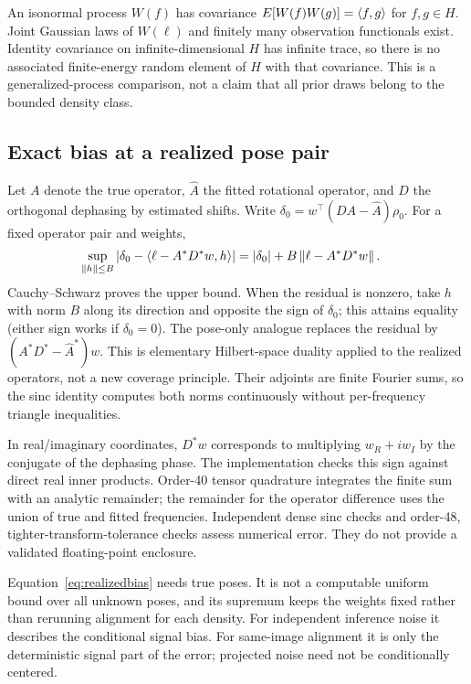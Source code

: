 An isonormal process $W(f)$ has covariance $E[W(f)W(g)]=\langle f,g\rangle$ for
$f,g\in H$. Joint Gaussian laws of $W(\ell)$ and finitely many observation
functionals exist. Identity covariance on infinite-dimensional $H$ has
infinite trace, so there is no associated finite-energy random element of
$H$ with that covariance. This is a generalized-process comparison, not a
claim that all prior draws belong to the bounded density class.

\subsection{Exact bias at a realized pose pair}\label{app:realized}
Let $A$ denote the true operator, $\widehat A$ the fitted rotational operator,
and $D$ the orthogonal dephasing by estimated shifts. Write
$\delta_0=w^\top(DA-\widehat A)\rho_0$. For a fixed operator pair and weights,
\begin{align}
\sup_{\left\|h\right\|\le B}|\delta_0-\langle \ell-A^*D^*w,h\rangle|
&=|\delta_0|+B\left\|\ell-A^*D^*w\right\|.\label{eq:realizedbias}
\end{align}
Cauchy--Schwarz proves the upper bound. When the residual is nonzero, take
$h$ with norm $B$ along its direction and opposite the sign of $\delta_0$;
this attains equality (either sign works if $\delta_0=0$). The pose-only
analogue replaces the residual by $(A^*D^*-\widehat A^*)w$. This is elementary
Hilbert-space duality applied to the realized operators, not a new coverage
principle. Their adjoints are finite Fourier sums, so the sinc identity
computes both norms continuously without per-frequency triangle inequalities.

In real/imaginary coordinates, $D^*w$ corresponds to multiplying
$w_R+iw_I$ by the conjugate of the dephasing phase. The implementation checks
this sign against direct real inner products. Order-40 tensor quadrature
integrates the finite sum with an analytic remainder; the remainder for the
operator difference uses the union of true and fitted frequencies. Independent
dense sinc checks and order-48, tighter-transform-tolerance checks assess
numerical error. They do not provide a validated floating-point enclosure.

Equation~\eqref{eq:realizedbias} needs true poses. It is not a computable
uniform bound over all unknown poses, and its supremum keeps the weights
fixed rather than rerunning alignment for each density. For independent
inference noise it describes the conditional signal bias. For same-image
alignment it is only the deterministic signal part of the error; projected
noise need not be conditionally centered.


